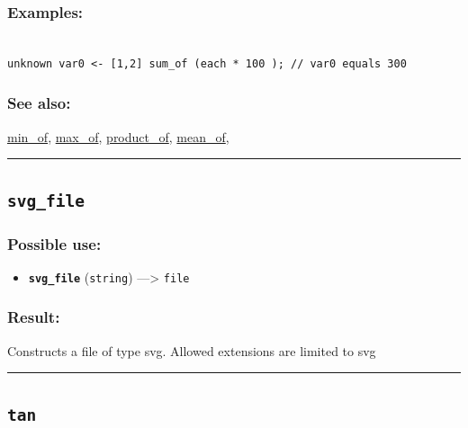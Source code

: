 \documentclass[]{book}
\providecommand{\tightlist}{%
  \setlength{\itemsep}{0pt}\setlength{\parskip}{0pt}}
\theoremstyle{definition}
\theoremstyle{definition}
\theoremstyle{definition}
\theoremstyle{remark}
\begin{document}
\subsubsection{Examples:}\label{examples-353}

\begin{verbatim}
 
unknown var0 <- [1,2] sum_of (each * 100 ); // var0 equals 300
\end{verbatim}

\subsubsection{See also:}\label{see-also-200}

\href{operators-i-to-m.html\#min_of}{min\_of},
\href{operators-i-to-m.html\#max_of}{max\_of},
\href{operators-n-to-r.html\#product_of}{product\_of},
\href{operators-i-to-m.html\#mean_of}{mean\_of},

\begin{center}\rule{0.5\linewidth}{\linethickness}\end{center}

\subsection{\texorpdfstring{\texttt{svg\_file}}{svg\_file}}\label{svg_file}

\subsubsection{Possible use:}\label{possible-use-511}

\begin{itemize}
\tightlist
\item
  \textbf{\texttt{svg\_file}} (\texttt{string}) ---\textgreater{}
  \texttt{file}
\end{itemize}

\subsubsection{Result:}\label{result-494}

Constructs a file of type svg. Allowed extensions are limited to svg

\begin{center}\rule{0.5\linewidth}{\linethickness}\end{center}

\subsection{\texorpdfstring{\texttt{tan}}{tan}}\label{tan}
\end{document}

